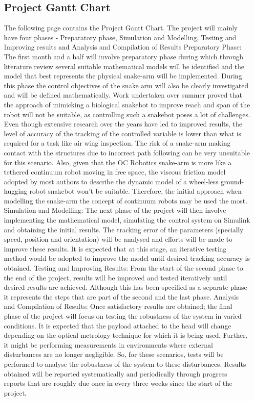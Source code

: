 \documentclass[a4paper,12pt]{report}
\begin{document}
\begin{appendices}
	\chapter{Project Gantt Chart}
	The following page contains the Project Gantt Chart.
	The project will mainly have four phases - Preparatory phase, Simulation and Modelling, Testing and Improving results and Analysis and Compilation of Results
	Preparatory Phase: The first month and a half will involve preparatory phase during which through literature review several suitable mathematical models will be identified and the model that best represents the physical snake-arm will be implemented. During this phase the control objectives of the snake arm will also be clearly investigated and will be defined mathematically.
	Work undertaken over summer proved that the approach of mimicking a biological snakebot to improve reach and span of the robot will not be suitable, as controlling such a snakebot poses a lot of challenges. Even though extensive research over the years have led to improved results, the level of accuracy of the tracking of the controlled variable is lower than what is required for a task like air wing inspection. The risk of a snake-arm making contact with the structures due to incorrect path following can be very unsuitable for this scenario. Also, given that the OC Robotics snake-arm is more like a tethered continuum robot moving in free space, the viscous friction model adopted by most authors to describe the dynamic model of a wheel-less ground-hugging robot snakebot won’t be suitable. Therefore, the initial approach when modelling the snake-arm the concept of continuum robots may be used the most.
	Simulation and Modelling: The next phase of the project will then involve implementing the mathematical model, simulating the control system on Simulink and obtaining the initial results. The tracking error of the parameters (specially speed, position and orientation) will be analysed and efforts will be made to improve these results. It is expected that at this stage, an iterative testing method would be adopted to improve the model until desired tracking accuracy is obtained.
	Testing and Improving Results: From the start of the second phase to the end of the project, results will be improved and tested iteratively until desired results are achieved. Although this has been specified as a separate phase it represents the steps that are part of the second and the last phase. 
	Analysis and Compilation of Results: Once satisfactory results are obtained; the final phase of the project will focus on testing the robustness of the system in varied conditions. It is expected that the payload attached to the head will change depending on the optical metrology technique for which it is being used. Further, it might be performing measurements in environments where external disturbances are no longer negligible. So, for these scenarios, tests will be performed to analyse the robustness of the system to these disturbances.
	Results obtained will be reported systematically and periodically through progress reports that are roughly due once in every three weeks since the start of the project.
	

\end{appendices}
\end{document}
